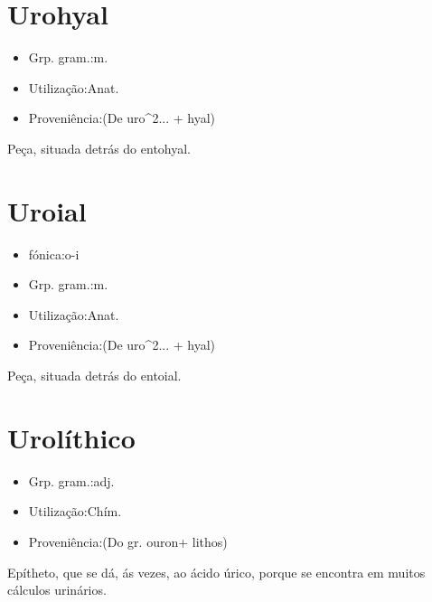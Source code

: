 \documentclass{article}
\begin{document}
\section{Urohyal}
\begin{itemize}
\item {Grp. gram.:m.}
\end{itemize}
\begin{itemize}
\item {Utilização:Anat.}
\end{itemize}
\begin{itemize}
\item {Proveniência:(De \textunderscore uro\textunderscore ^2... + \textunderscore hyal\textunderscore )}
\end{itemize}
Peça, situada detrás do entohyal.
\section{Uroial}
\begin{itemize}
\item {fónica:o-i}
\end{itemize}
\begin{itemize}
\item {Grp. gram.:m.}
\end{itemize}
\begin{itemize}
\item {Utilização:Anat.}
\end{itemize}
\begin{itemize}
\item {Proveniência:(De \textunderscore uro\textunderscore ^2... + \textunderscore hyal\textunderscore )}
\end{itemize}
Peça, situada detrás do entoial.
\section{Urolíthico}
\begin{itemize}
\item {Grp. gram.:adj.}
\end{itemize}
\begin{itemize}
\item {Utilização:Chím.}
\end{itemize}
\begin{itemize}
\item {Proveniência:(Do gr. \textunderscore ouron\textunderscore  + \textunderscore lithos\textunderscore )}
\end{itemize}
Epítheto, que se dá, ás vezes, ao ácido úrico, porque se encontra em muitos cálculos urinários.
\end{document}
